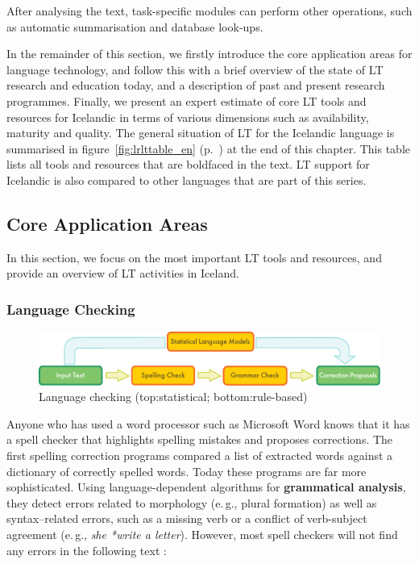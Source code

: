 \begin{multicols}{2}
After analysing the text, task-specific modules can perform other operations, such as automatic summarisation and database look-ups.

In the remainder of this section, we firstly introduce the core application areas for language technology, and follow this with a brief overview of the state of LT research and education today, and a description of past and present research programmes. Finally, we present an expert estimate of core LT tools and resources for Icelandic in terms of various dimensions such as availability, maturity and quality. The general situation of LT for the Icelandic language is summarised in figure~\ref{fig:lrlttable_en} (p.~\pageref{fig:lrlttable_en}) at the end of this chapter. This table lists all tools and resources that are boldfaced in the text. LT support for Icelandic is also compared to other languages that are part of this series.

\subsection{Core Application Areas}

In this section, we focus on the most important LT tools and resources, and provide an overview of LT activities in Iceland. 

\subsubsection{Language Checking}

\begin{figure}[t]
  \center
  \includegraphics[width=\textwidth]{../_media/english/language_checking}
  \caption{Language checking (top:statistical; bottom:rule-based)}
  \label{fig:langcheckingaarch_en}
\end{figure}

Anyone who has used a word processor such as Microsoft Word knows that it has a spell checker that highlights spelling mistakes and proposes corrections. The first spelling correction programs compared a list of extracted words against a dictionary of correctly spelled words. Today these programs are far more sophisticated. Using language-dependent algorithms for \textbf{grammatical analysis}, they detect errors related to morphology (e.\,g., plural formation) as well as syntax--related errors, such as a missing verb or a conflict of verb-subject agreement (e.\,g., \textit{she *write a letter}). However, most spell checkers will not find any errors in the following text \cite{zar1}:


\end{multicols}
